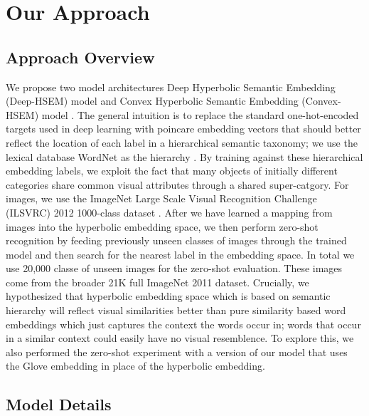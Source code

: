 \documentclass[12pt]{report}
\begin{document}
\chapter{Our Approach}

\section{Approach Overview}
We propose two model architectures Deep Hyperbolic Semantic Embedding (Deep-HSEM) model  and Convex Hyperbolic Semantic Embedding (Convex-HSEM) model . The general intuition is to replace the standard one-hot-encoded targets used in deep learning with poincare embedding vectors that should better reflect the location of each label in a hierarchical semantic taxonomy; we use the lexical database WordNet as the hierarchy \cite{Miller1995}. By training against these hierarchical embedding labels, we exploit the fact that many objects of initially different categories share common visual attributes through a shared super-catgory. For images, we use the ImageNet Large Scale Visual Recognition Challenge (ILSVRC) 2012 1000-class dataset \cite{JiaDeng2009}. After we have learned a mapping from images into the hyperbolic embedding space, we then perform zero-shot recognition by feeding previously unseen classes of images through the trained model and then search for the nearest label in the embedding space. In total we use 20,000 classe of unseen images for the zero-shot evaluation. These images come from the broader 21K full ImageNet 2011 dataset. Crucially, we hypothesized that hyperbolic embedding space which is based on semantic hierarchy will reflect visual similarities better than pure similarity based word embeddings which just captures the context the words occur in; words that occur in a similar context could easily have no visual resemblence. To explore this, we also performed the zero-shot experiment with a version of our model that uses the Glove embedding in place of the hyperbolic embedding.

\section{Model Details}
\end{document}
